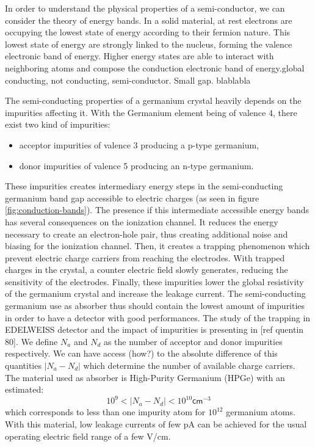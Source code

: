 In order to understand the physical properties of a semi-conductor, we can consider the theory of energy bands. In a solid material, at rest electrons are occupying the lowest state of energy according to their fermion nature. This lowest state of energy are strongly linked to the nucleus, forming the valence electronic band of energy. Higher energy states are able to interact with neighboring atoms and compose the conduction electronic band of energy.global
conducting, not conducting, semi-conductor. Small gap. blablabla

The semi-conducting properties of a germanium crystal heavily depends on the impurities affecting it. With the Germanium element being of valence 4, there exist two kind of impurities:
\begin{itemize}
	\item acceptor impurities of valence 3 producing a p-type germanium,
	\item donor impurities of valence 5 producing an n-type germanium.
\end{itemize}
These impurities creates intermediary energy steps in the semi-conducting germanium band gap accessible to electric charges (as seen in figure \ref{fig:conduction-bands}). The presence if this intermediate accessible energy bands has several consequences on the ionization channel. It reduces the energy necessary to create an electron-hole pair, thus creating additional noise and biasing for the ionization channel. Then, it creates a trapping phenomenon which prevent electric charge carriers from reaching the electrodes. With trapped charges in the crystal, a counter electric field slowly generates, reducing the sensitivity of the electrodes. Finally, these impurities lower the global resistivity of the germanium crystal and increase the leakage current.
The semi-conducting germanium use as absorber thus should contain the lowest amount of impurities in order to have a detector with good performances.
The study of the trapping in EDELWEISS detector and the impact of impurities is presenting in [ref quentin 80].
We define $N_a$ and $N_d$ as the number of acceptor and donor impurities respectively. We  can have access (how?) to the absolute difference of this quantities $|N_a - N_d|$ which determine the number of available charge carriers.
The material used as absorber is High-Purity Germanium (HPGe) with an estimated:
$$ 10^{9} < |N_a - N_d| < 10^{10} \textsf{cm}^{-3}$$
which corresponds to less than one impurity atom for $10^{12}$ germanium atoms. With this material, low leakage currents of few pA can be achieved for the usual operating  electric field range of a few V/cm.

